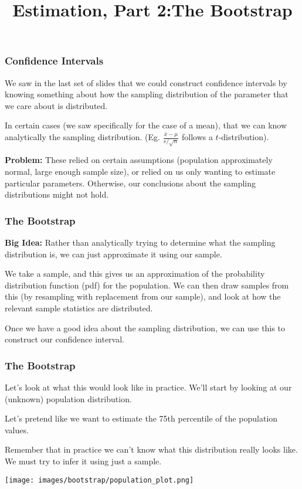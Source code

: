 \documentclass[11pt, table]{beamer}
\begin{document}
	\title{Estimation, Part 2:\newline The Bootstrap}
	\date{}
	\begin{frame}[plain]
	\maketitle
\end{frame}

\begin{frame}
\frametitle{Confidence Intervals}
We saw in the last set of slides that we could construct confidence intervals by knowing something about how the sampling distribution of the parameter that we care about is distributed.
\vspace{0.2in}

In certain cases (we saw specifically for the case of a mean), that we can know analytically the sampling distribution. (Eg. $\frac{\bar{x} - \mu}{s / \sqrt{n}}$ follows a $t$-distribution).
\vspace{0.2in}

\textbf{Problem:} These relied on certain assumptions (population approximately normal, large enough sample size), or relied on us only wanting to estimate particular parameters. Otherwise, our conclusions about the sampling distributions might not hold.
\end{frame}

\begin{frame}
\frametitle{The Bootstrap}
\textbf{Big Idea:} Rather than analytically trying to determine what the sampling distribution is, we can just approximate it using our sample.
\vspace{0.2in}

We take a sample, and this gives us an approximation of the probability distribution function (pdf) for the population. We can then draw samples from this (by resampling with replacement from our sample), and look at how the relevant sample statistics are distributed.
\vspace{0.2in}

Once we have a good idea about the sampling distribution, we can use this to construct our confidence interval.
\end{frame}

\begin{frame}
\frametitle{The Bootstrap}
Let's look at what this would look like in practice. We'll start by looking at our (unknown) population distribution.

Let's pretend like we want to estimate the 75th percentile of the population values.

 Remember that in practice we can't know what this distribution really looks like. We must try to infer it using just a sample.

\begin{center}
	\texttt{[image: images/bootstrap/population\_plot.png]}
\end{center}
\end{frame}
\end{document}
